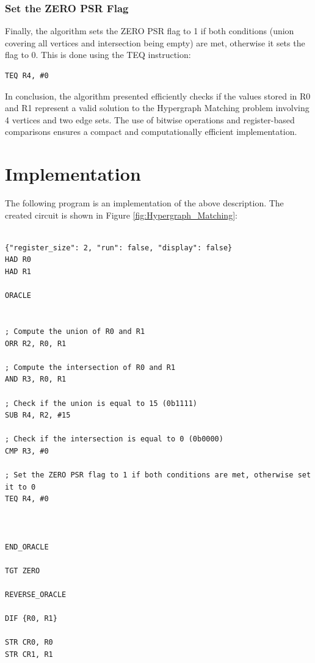 \subsubsection{Set the ZERO PSR Flag}

Finally, the algorithm sets the ZERO PSR flag to 1 if both conditions (union covering all vertices and intersection being empty) are met, otherwise it sets the flag to 0. This is done using the TEQ instruction:

\begin{verbatim}
TEQ R4, #0
\end{verbatim}

In conclusion, the algorithm presented efficiently checks if the values stored in R0 and R1 represent a valid solution to the Hypergraph Matching problem involving 4 vertices and two edge sets. The use of bitwise operations and register-based comparisons ensures a compact and computationally efficient implementation.



\section{Implementation}

The following program is an implementation of the above description. The created circuit is shown in Figure \ref{fig:Hypergraph_Matching}:

\begin{lstlisting}

{"register_size": 2, "run": false, "display": false}
HAD R0
HAD R1

ORACLE


; Compute the union of R0 and R1
ORR R2, R0, R1

; Compute the intersection of R0 and R1
AND R3, R0, R1

; Check if the union is equal to 15 (0b1111)
SUB R4, R2, #15

; Check if the intersection is equal to 0 (0b0000)
CMP R3, #0

; Set the ZERO PSR flag to 1 if both conditions are met, otherwise set it to 0
TEQ R4, #0



END_ORACLE

TGT ZERO

REVERSE_ORACLE

DIF {R0, R1}

STR CR0, R0
STR CR1, R1


\end{lstlisting}

